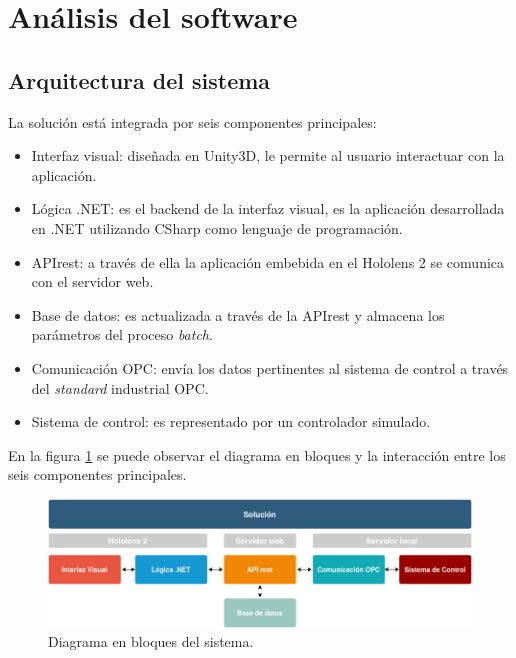\section{Análisis del software}

\subsection{Arquitectura del sistema}
La solución está integrada por seis componentes principales:

\begin{itemize}
\item Interfaz visual: diseñada en Unity3D, le permite al usuario interactuar con la aplicación.
\item Lógica .NET: es el backend de la interfaz visual, es la aplicación desarrollada en .NET utilizando CSharp como lenguaje de programación.
\item APIrest: a través de ella la aplicación embebida en el Hololens 2 se comunica con el servidor web.
\item Base de datos: es actualizada a través de la APIrest y almacena los parámetros del proceso \textit{batch}.
\item Comunicación OPC: envía los datos pertinentes al sistema de control a través del \textit{standard} industrial OPC.
\item Sistema de control: es representado por un controlador simulado.
\end{itemize}

En la figura \ref{fig:Diag_bloques} se puede observar el diagrama en bloques y la interacción entre los seis componentes principales.

\begin{figure}[htpb]
	\centering
	\includegraphics[scale=.5]{./Figures/Diag_bloques.jpg}
	\caption{Diagrama en bloques del sistema\protect\footnotemark.}
	\label{fig:Diag_bloques}
\end{figure}

